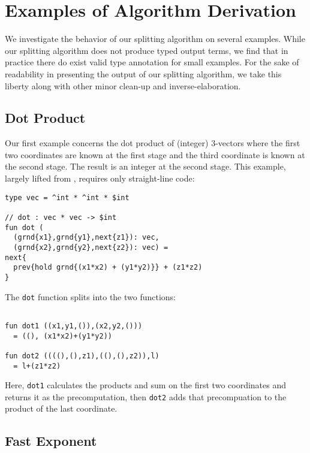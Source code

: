  \section{Examples of Algorithm Derivation}
\label{sec:examples}

We investigate the behavior of our splitting algorithm on several examples.
While our splitting algorithm does not produce typed output terms,
we find that in practice there do exist valid type annotation for small examples.
For the sake of readability in presenting the output of our splitting algorithm,
we take this liberty along with other minor clean-up and inverse-elaboration.

\subsection{Dot Product}

Our first example concerns the dot product of (integer) 3-vectors where 
the first two coordinates are known at the first stage and the 
third coordinate is known at the second stage.
The result is an integer at the second stage.
This example, largely lifted from \cite{knoblock96}, requires only straight-line code:
\begin{lstlisting} 
type vec = ^int * ^int * $int

// dot : vec * vec -> $int
fun dot (
  (grnd{x1},grnd{y1},next{z1}): vec, 
  (grnd{x2},grnd{y2},next{z2}): vec) = 
next{
  prev{hold grnd{(x1*x2) + (y1*y2)}} + (z1*z2)
}
\end{lstlisting}
The \texttt{dot} function splits into the two functions:
\begin{lstlisting} 

fun dot1 ((x1,y1,()),(x2,y2,())) 
  = ((), (x1*x2)+(y1*y2))

fun dot2 ((((),(),z1),((),(),z2)),l) 
  = l+(z1*z2)
\end{lstlisting}
Here, \texttt{dot1} calculates the products and sum on the first two coordinates and returns it as the precomputation,
then \texttt{dot2} adds that precompuation to the product of the last coordinate.

\subsection{Fast Exponent}

